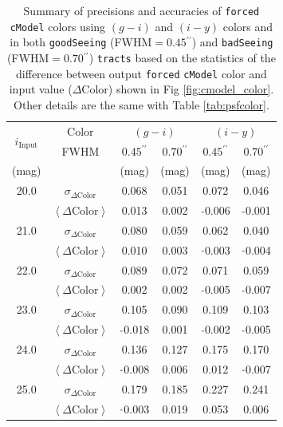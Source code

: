 \documentclass[useamsfonts]{pasj01}
\def\asec{$^{\prime\prime}$}
\def\cmodel{\texttt{cModel}}
\def\forced{\texttt{forced}}
\def\tracts{\texttt{tracts}}
\newcommand{\minus}{\raisebox{.4\height}{\scalebox{.8}{-}}}
\newcommand{\scolor}{$\sigma_{\Delta\mathrm{Color}}$}
\newcommand{\mcolor}{$\left<{\Delta\mathrm{Color}}\right>$}
\newcommand{\n}{$\minus$}
\begin{document}
\begin{table}
    \begin{center}
    \begin{tabular}{| c | c | c | c | c | c | }
    \hline
    \multirow{2}{*}{$i_{\mathrm{Input}}$} & Color & \multicolumn{2}{|c|}{$(g-i)$} & \multicolumn{2}{|c|}{$(i-y)$} \\
    \cline{2-6}
      & FWHM & $0.45$\asec{} & $0.70$\asec{} & $0.45$\asec{} & $0.70$\asec{} \\
    \hline
    (mag) & & (mag) & (mag) & (mag) & (mag) \\
    \hline \hline
    \rowcolor[gray]{.85} 20.0 & \scolor{} &   0.068 & 0.051 &   0.072 &   0.046 \\
    \rowcolor[gray]{.85}      & \mcolor{} &   0.013 & 0.002 & \n0.006 & \n0.001 \\
    \hline 
    \rowcolor[gray]{1.0} 21.0 & \scolor{} &   0.080 & 0.059 &   0.062 &   0.040 \\
    \rowcolor[gray]{1.0}      & \mcolor{} &   0.010 & 0.003 & \n0.003 & \n0.004 \\
    \hline
    \rowcolor[gray]{.85} 22.0 & \scolor{} &   0.089 & 0.072 &   0.071 &   0.059 \\
    \rowcolor[gray]{.85}      & \mcolor{} &   0.002 & 0.002 & \n0.005 & \n0.007 \\
    \hline
    \rowcolor[gray]{1.0} 23.0 & \scolor{} &   0.105 & 0.090 &   0.109 &   0.103 \\
    \rowcolor[gray]{1.0}      & \mcolor{} & \n0.018 & 0.001 & \n0.002 & \n0.005 \\
    \hline
    \rowcolor[gray]{.85} 24.0 & \scolor{} &   0.136 & 0.127 &   0.175 &   0.170 \\
    \rowcolor[gray]{.85}      & \mcolor{} & \n0.008 & 0.006 &   0.012 & \n0.007 \\
    \hline
    \rowcolor[gray]{1.0} 25.0 & \scolor{} &   0.179 & 0.185 &   0.227 &   0.241 \\
    \rowcolor[gray]{1.0}      & \mcolor{} & \n0.003 & 0.019 &   0.053 &   0.006 \\
    \hline
    \end{tabular}
    \end{center}
    \caption{
        Summary of precisions and accuracies of \forced{} \cmodel{} colors using 
        $(g-i)$ and $(i-y)$ colors and in both \texttt{goodSeeing} (FWHM$=0.45$\asec{}) 
        and \texttt{badSeeing} (FWHM$=0.70$\asec{}) \tracts{} based on the statistics of 
        the difference between output \forced{} \cmodel{} color and input value 
        ($\Delta\mathrm{Color}$) shown in Fig \ref{fig:cmodel_color}.
        Other details are the same with Table \ref{tab:psfcolor}.
    }
        \label{tab:cmodelcolor}
\end{table}
\end{document}
